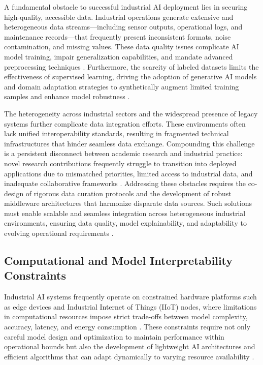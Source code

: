 \documentclass[sigconf]{acmart}
\begin{document}
A fundamental obstacle to successful industrial AI deployment lies in securing high-quality, accessible data. Industrial operations generate extensive and heterogeneous data streams—including sensor outputs, operational logs, and maintenance records—that frequently present inconsistent formats, noise contamination, and missing values. These data quality issues complicate AI model training, impair generalization capabilities, and mandate advanced preprocessing techniques \cite{ref6,ref9}. Furthermore, the scarcity of labeled datasets limits the effectiveness of supervised learning, driving the adoption of generative AI models and domain adaptation strategies to synthetically augment limited training samples and enhance model robustness \cite{ref2,ref3}.

The heterogeneity across industrial sectors and the widespread presence of legacy systems further complicate data integration efforts. These environments often lack unified interoperability standards, resulting in fragmented technical infrastructures that hinder seamless data exchange. Compounding this challenge is a persistent disconnect between academic research and industrial practice: novel research contributions frequently struggle to transition into deployed applications due to mismatched priorities, limited access to industrial data, and inadequate collaborative frameworks \cite{ref3}. Addressing these obstacles requires the co-design of rigorous data curation protocols and the development of robust middleware architectures that harmonize disparate data sources. Such solutions must enable scalable and seamless integration across heterogeneous industrial environments, ensuring data quality, model explainability, and adaptability to evolving operational requirements \cite{ref6,ref9}.

\subsection{Computational and Model Interpretability Constraints}

Industrial AI systems frequently operate on constrained hardware platforms such as edge devices and Industrial Internet of Things (IIoT) nodes, where limitations in computational resources impose strict trade-offs between model complexity, accuracy, latency, and energy consumption \cite{ref2,ref31}. These constraints require not only careful model design and optimization to maintain performance within operational bounds but also the development of lightweight AI architectures and efficient algorithms that can adapt dynamically to varying resource availability \cite{ref31,ref34}.
\end{document}
